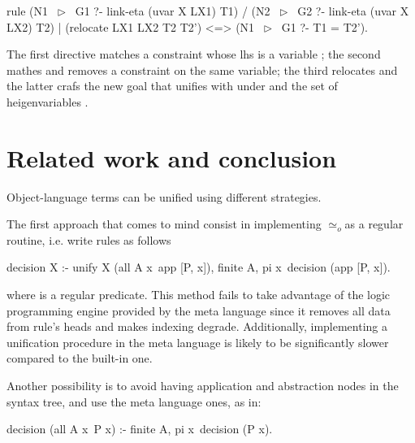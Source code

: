 \documentclass[sigconf,natbib=false,review]{acmart}
\newcommand{\UnifRel}{\ensuremath{\simeq}}
\newcommand{\Uo}{\texorpdfstring{\ensuremath{\UnifRel_o}\xspace}{unif\_o}}
\newcommand{\lhs}{lhs\xspace}
\begin{document}
\begin{elpicode}
  rule (N1 ~$\triangleright$~ G1 ?- link-eta (uvar X LX1) T1)   %
    /  (N2 ~$\triangleright$~ G2 ?- link-eta (uvar X LX2) T2)   %
    |  (relocate LX1 LX2 T2 T2')               %
   <=> (N1 ~$\triangleright$~ G1 ?- T1 = T2').                  %
\end{elpicode}

\noindent
The first directive matches a constraint
whose \lhs is a variable ; the second mathes and removes
a constraint on the same variable; the third
relocates  and the latter crafs the new goal that unifies
 with  under  and the set of
heigenvariables .


\noindent
\section{Related work and conclusion}

Object-language terms can be unified using
different strategies.

The first approach that comes to mind consist in implementing \Uo as a
regular routine, i.e. write rules as follows

\begin{elpicode}
  decision X :- unify X (all A x\ app [P, x]), finite A,
    pi x\ decision (app [P, x]).
\end{elpicode}

\noindent
where  is a regular predicate.
This method fails to take advantage of the logic
programming engine provided by the meta language since
it removes all data from rule's heads and makes
indexing degrade. Additionally,
implementing a unification procedure in the meta language is likely to be significantly
slower compared to the built-in one.

Another possibility is to avoid having application and abstraction nodes
in the syntax tree, and use the meta language ones, as in:

\begin{elpicode}
decision (all A x\ P x) :- finite A, pi x\ decision (P x).
\end{elpicode}
\end{document}
